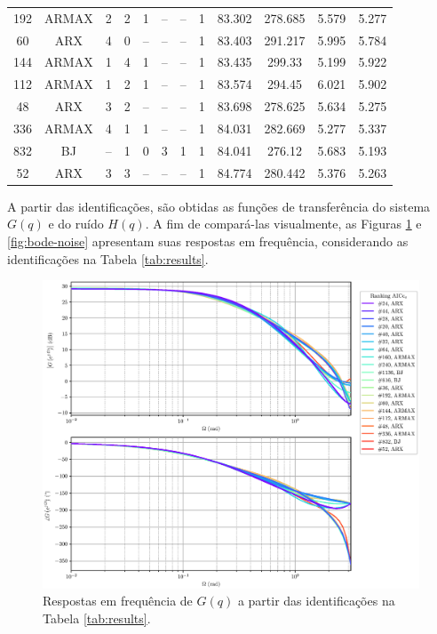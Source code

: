 \documentclass{ppgeesa}
\begin{document}
\begin{table}
\begin{tabularx}{\textwidth}{@{} c *{10}{C} c @{}}
    192  & ARMAX  & \num{2} & \num{2} & \num{1} &  --       &  --   & \num{1} & \num{83.302} & \num{278.685} & \num{5.579} & \num{5.277} \\
    60   & ARX    & \num{4} & \num{0} &  --     &  --       &  --   & \num{1} & \num{83.403} & \num{291.217} & \num{5.995} & \num{5.784} \\
    144  & ARMAX  & \num{1} & \num{4} & \num{1} &  --       &  --   & \num{1} & \num{83.435} & \num{299.33 } & \num{5.199} & \num{5.922} \\
    112  & ARMAX  & \num{1} & \num{2} & \num{1} &  --       &  --   & \num{1} & \num{83.574} & \num{294.45 } & \num{6.021} & \num{5.902} \\
    48   & ARX    & \num{3} & \num{2} &  --     &  --       &  --   & \num{1} & \num{83.698} & \num{278.625} & \num{5.634} & \num{5.275} \\
    336  & ARMAX  & \num{4} & \num{1} & \num{1} &  --       &  --   & \num{1} & \num{84.031} & \num{282.669} & \num{5.277} & \num{5.337} \\
    832  & BJ     &  --     & \num{1} & \num{0} & \num{3} & \num{1} & \num{1} & \num{84.041} & \num{276.12 } & \num{5.683} & \num{5.193} \\
    52   & ARX    & \num{3} & \num{3} &  --     &  --       &  --   & \num{1} & \num{84.774} & \num{280.442} & \num{5.376} & \num{5.263} \\
    \bottomrule
  \end{tabularx}
\end{table}

A partir das identificações, são obtidas as funções de transferência do sistema $G(q)$ e do ruído $H(q)$.
A fim de compará-las visualmente, as Figuras \ref{fig:bode-system} e \ref{fig:bode-noise} apresentam suas respostas em frequência, considerando as identificações na Tabela \ref{tab:results}.

\begin{figure}[!htbp]
  \centering
  \includegraphics[width=\linewidth]{bode_G_AICCv}
  \caption{Respostas em frequência de $G(q)$ a partir das identificações na Tabela \ref{tab:results}.}
  \label{fig:bode-system}
\end{figure}
\end{document}
